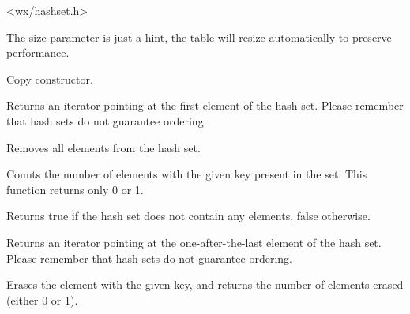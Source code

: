 
<wx/hashset.h>


\label{wxhashsetctor}


The size parameter is just a hint, the table will resize automatically
to preserve performance.


Copy constructor.

\label{wxhashsetbegin}



Returns an iterator pointing at the first element of the hash set.
Please remember that hash sets do not guarantee ordering.

\label{wxhashsetclear}


Removes all elements from the hash set.

\label{wxhashsetcount}


Counts the number of elements with the given key present in the set.
This function returns only 0 or 1.

\label{wxhashsetempty}


Returns true if the hash set does not contain any elements, false otherwise.

\label{wxhashsetend}



Returns an iterator pointing at the one-after-the-last element of the hash set.
Please remember that hash sets do not guarantee ordering.

\label{wxhashseterase}


Erases the element with the given key, and returns the number of elements
erased (either 0 or 1).

